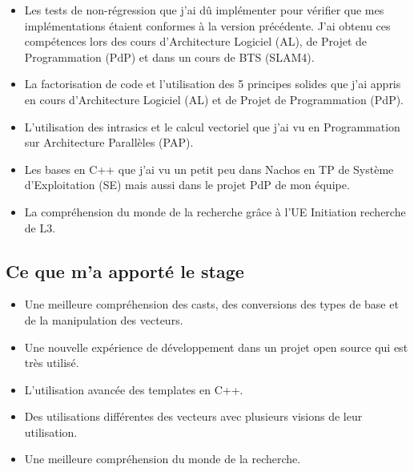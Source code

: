 \begin{itemize}
  \item Les tests de non-régression que j'ai dû implémenter pour vérifier que mes
  implémentations étaient conformes à la version précédente. J'ai obtenu ces compétences
  lors des cours d'Architecture Logiciel (AL), de Projet de Programmation (PdP) et dans
  un cours de BTS (SLAM4).
  \item La factorisation de code et l'utilisation des 5 principes solides que j'ai
  appris en cours d'Architecture Logiciel (AL) et de Projet de Programmation (PdP).
  \item L'utilisation des intrasics et le calcul vectoriel que j'ai vu en Programmation
  sur Architecture Parallèles (PAP).
  \item Les bases en C++ que j'ai vu un petit peu dans Nachos en TP de Système
  d'Exploitation (SE) mais aussi dans le projet PdP de mon équipe.
  \item La compréhension du monde de la recherche grâce à l'UE Initiation recherche de L3.
\end{itemize}

\subsection{Ce que m'a apporté le stage}

\begin{itemize}
  \item Une meilleure compréhension des casts, des conversions des types de base et de la
  manipulation des vecteurs.
  \item Une nouvelle expérience de développement dans un projet open source qui est très
  utilisé.
  \item L'utilisation avancée des templates en C++.
  \item Des utilisations différentes des vecteurs avec plusieurs visions de leur
  utilisation.
  \item Une meilleure compréhension du monde de la recherche.
\end{itemize}
